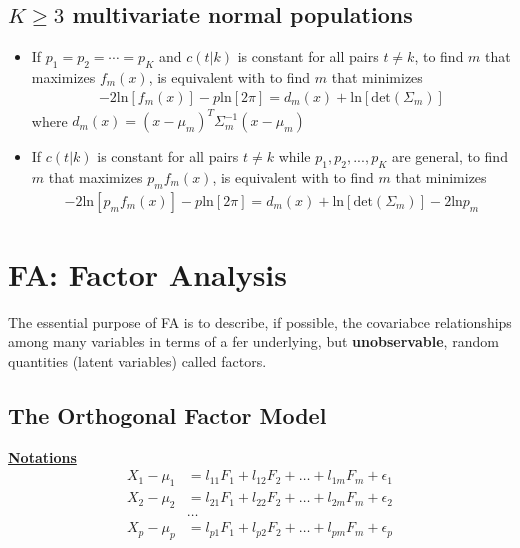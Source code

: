 \documentclass[12pt]{extarticle}
\newcommand{\<}{\langle}
\renewcommand{\>}{\rangle}
\theoremstyle{definition}
\begin{document}
\subsection{$K \geq 3$ multivariate normal populations}
\begin{itemize}
    \item If $p_1 =p_2 =\cdots =p_K$ and $c(t|k)$ is constant for all pairs $t \neq k$, to find $m$ that maximizes $f_m(x)$, is equivalent with to find $m$ that minimizes
    \begin{align*}
        -2\text{ln}[f_m(x)] -p\text{ln}[2\pi] = d_m(x) +\text{ln}[\text{det}(\Sigma_m)]
    \end{align*}
    where $d_m(x)=(x-\mu_m)^T \Sigma^{-1}_m (x-\mu_m)$
    \item If $c(t|k)$ is constant for all pairs $t \neq k$ while $p_1,p_2,...,p_K$ are general, to find $m$ that maximizes $p_m f_m (x)$, is equivalent with to find $m$ that minimizes
    \begin{align*}
        -2\text{ln}[p_m f_m(x)] -p\text{ln}[2\pi] = d_m(x) + \text{ln}[\text{det}(\Sigma_m)] -2\text{ln}p_m
    \end{align*}
\end{itemize}

\newpage
\section{FA: Factor Analysis}
The essential purpose of FA is to describe, if possible, the covariabce relationships among many variables in terms of a fer underlying, but \textbf{unobservable}, random quantities (latent variables) called factors.

\subsection{The Orthogonal Factor Model}
\underline{\textbf{Notations}}
\begin{align*}
    X_1 -\mu_1 &= l_{11}F_1 +l_{12}F_2 + \dots + l_{1m}F_m + \epsilon_1\\
    X_2 -\mu_2 &= l_{21}F_1 +l_{22}F_2 + \dots + l_{2m}F_m + \epsilon_2\\
    &\dots \\
    X_p -\mu_p &= l_{p1}F_1 +l_{p2}F_2 + \dots + l_{pm}F_m + \epsilon_p\\
\end{align*}
\end{document}
